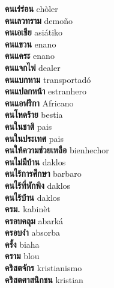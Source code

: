 \textbf{ คนเร่ร่อน  } chòler \\
\textbf{ คนเลวทราม  } demoño \\
\textbf{ คนเอเชีย  } asiátiko \\
\textbf{ คนแขวน  } enano \\
\textbf{ คนแคระ  } enano \\
\textbf{ คนแจกไพ่  } dealer \\
\textbf{ คนแบกหาม  } transportadó \\
\textbf{ คนแปลกหน้า  } estranhero \\
\textbf{ คนแอฟริกา  } Africano \\
\textbf{ คนโหดร้าย  } bestia \\
\textbf{ คนในชาติ  } pais \\
\textbf{ คนในประเทศ  } pais \\
\textbf{ คนให้ความช่วยเหลือ  } bienhechor \\
\textbf{ คนไม่มีบ้าน  } daklos \\
\textbf{ คนไร้การศึกษา  } barbaro \\
\textbf{ คนไร้ที่พักพิง  } daklos \\
\textbf{ คนไร้บ้าน  } daklos \\
\textbf{ ครม.  } kabinèt \\
\textbf{ ครอบคลุม  } abarká \\
\textbf{ ครอบงำ  } absorba \\
\textbf{ ครั้ง  } biaha \\
\textbf{ คราม  } blou \\
\textbf{ คริสตจักร  } kristianismo \\
\textbf{ คริสตศาสนิกชน  } kristian \\
